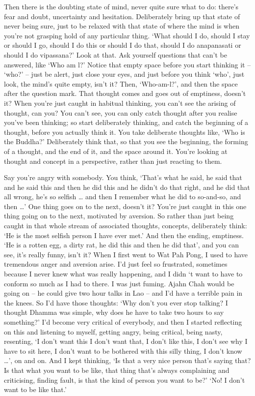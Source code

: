 Then there is the doubting state of mind, never quite sure what to do: there's fear and doubt, uncertainty and hesitation. Deliberately bring up that state of never being sure, just to be relaxed with that state of where the mind is when you're not grasping hold of any particular thing. `What should I do, should I stay or should I go, should I do this or should I do that, should I do anapanasati or should I do vipassana?' Look at that. Ask yourself questions that can't be answered, like `Who am l?' Notice that empty space before you start thinking it -- `who?' -- just be alert, just close your eyes, and just before you think `who', just look, the mind's quite empty, isn't it? Then, `Who-am-l?', and then the space after the question mark. That thought comes and goes out of emptiness, doesn't it? When you're just caught in habitual thinking, you can't see the arising of thought, can you? You can't see, you can only catch thought after you realise you've been thinking; so start deliberately thinking, and catch the beginning of a thought, before you actually think it. You take deliberate thoughts like, `Who is the Buddha?' Deliberately think that, so that you see the beginning, the forming of a thought, and the end of it, and the space around it. You're looking at thought and concept in a perspective, rather than just reacting to them.

Say you're angry with somebody. You think, `That's what he said, he said that and he said this and then he did this and he didn't do that right, and he did that all wrong, he's so selfish \ldots{} and then I remember what he did to so-and-so, and then \ldots{}' One thing goes on to the next, doesn't it? You're just caught in this one thing going on to the next, motivated by aversion. So rather than just being caught in that whole stream of associated thoughts, concepts, deliberately think: `He is the most selfish person I have ever met.' And then the ending, emptiness. `He is a rotten egg, a dirty rat, he did this and then he did that', and you can see, it's really funny, isn't it? When I first went to Wat Pah Pong, I used to have tremendous anger and aversion arise. I'd just feel so frustrated, sometimes because I never knew what was really happening, and I didn `t want to have to conform so much as I had to there. I was just fuming. Ajahn Chah would be going on -- he could give two hour talks in Lao -- and I'd have a terrible pain in the knees. So I'd have those thoughts: `Why don't you ever stop talking? I thought Dhamma was simple, why does he have to take two hours to say something?' I'd become very critical of everybody, and then I started reflecting on this and listening to myself, getting angry, being critical, being nasty, resenting, `I don't want this I don't want that, I don't like this, I don't see why I have to sit here, I don't want to be bothered with this silly thing, I don't know \ldots{}', on and on. And I kept thinking, `Is that a very nice person that's saying that? Is that what you want to be like, that thing that's always complaining and criticising, finding fault, is that the kind of person you want to be?' `No! I don't want to be like that.'

